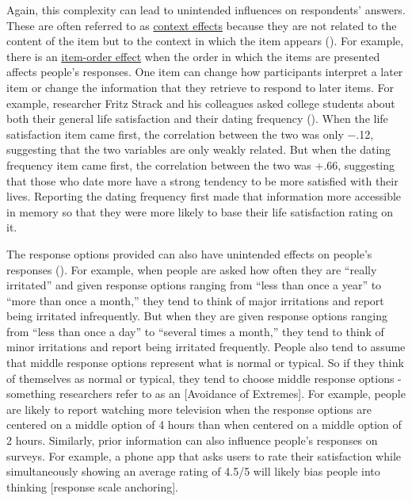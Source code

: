 \documentclass[
]{krantz}
\begin{document}
Again, this complexity can lead to unintended influences on respondents' answers. These are often referred to as \hyperref[context-effect]{context effects} because they are not related to the content of the item but to the context in which the item appears (). For example, there is an \hyperref[item-order-effect]{item-order effect} when the order in which the items are presented affects people's responses. One item can change how participants interpret a later item or change the information that they retrieve to respond to later items. For example, researcher Fritz Strack and his colleagues asked college students about both their general life satisfaction and their dating frequency (). When the life satisfaction item came first, the correlation between the two was only −.12, suggesting that the two variables are only weakly related. But when the dating frequency item came first, the correlation between the two was +.66, suggesting that those who date more have a strong tendency to be more satisfied with their lives. Reporting the dating frequency first made that information more accessible in memory so that they were more likely to base their life satisfaction rating on it.

The response options provided can also have unintended effects on people's responses (). For example, when people are asked how often they are ``really irritated'' and given response options ranging from ``less than once a year'' to ``more than once a month,'' they tend to think of major irritations and report being irritated infrequently. But when they are given response options ranging from ``less than once a day'' to ``several times a month,'' they tend to think of minor irritations and report being irritated frequently. People also tend to assume that middle response options represent what is normal or typical. So if they think of themselves as normal or typical, they tend to choose middle response options - something researchers refer to as an {[}Avoidance of Extremes{]}. For example, people are likely to report watching more television when the response options are centered on a middle option of 4 hours than when centered on a middle option of 2 hours. Similarly, prior information can also influence people's responses on surveys. For example, a phone app that asks users to rate their satisfaction while simultaneously showing an average rating of 4.5/5 will likely bias people into thinking {[}response scale anchoring{]}.
\end{document}
